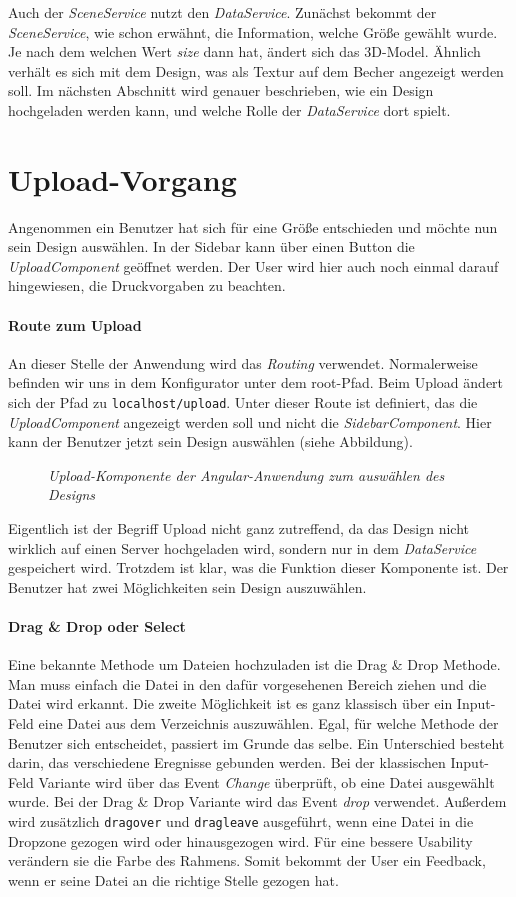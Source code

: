 Auch der \textit{SceneService} nutzt den \textit{DataService}. Zunächst bekommt der \textit{SceneService}, wie schon erwähnt, die Information, welche Größe gewählt wurde. Je nach dem welchen Wert \textit{size} dann hat, ändert sich das 3D-Model. Ähnlich verhält es sich mit dem Design, was als Textur auf dem Becher angezeigt werden soll. Im nächsten Abschnitt wird genauer beschrieben, wie ein Design hochgeladen werden kann, und welche Rolle der \textit{DataService} dort spielt.
%
\section{Upload-Vorgang}
\label{sec:umsetzung}
%
Angenommen ein Benutzer hat sich für eine Größe entschieden und möchte nun sein Design auswählen. In der Sidebar kann über einen Button die \textit{UploadComponent} geöffnet werden. Der User wird hier auch noch einmal darauf hingewiesen, die Druckvorgaben zu beachten.
\paragraph{Route zum Upload}
An dieser Stelle der Anwendung wird das \textit{Routing} verwendet. Normalerweise befinden wir uns in dem Konfigurator unter dem root-Pfad. Beim Upload ändert sich der Pfad zu \texttt{localhost/upload}. Unter dieser Route ist definiert, das die \textit{UploadComponent} angezeigt werden soll und nicht die \textit{SidebarComponent}. Hier kann der Benutzer jetzt sein Design auswählen (siehe Abbildung).
%
\begin{figure}[h]
	\centering
	{}
	\caption[UploadComponent des Konfigurators]{\textit{Upload-Komponente der Angular-Anwendung zum auswählen des Designs}}
	\label{fig:sidebar}
\end{figure}
%
Eigentlich ist der Begriff \glqq Upload \grqq nicht ganz zutreffend, da das Design nicht wirklich auf einen Server hochgeladen wird, sondern nur in dem \textit{DataService} gespeichert wird. Trotzdem ist klar, was die Funktion dieser Komponente ist. Der Benutzer hat zwei Möglichkeiten sein Design auszuwählen.
%
\paragraph{Drag \& Drop oder Select}
Eine bekannte Methode um Dateien hochzuladen ist die Drag \& Drop Methode. Man muss einfach die Datei in den dafür vorgesehenen Bereich ziehen und die Datei wird erkannt. Die zweite Möglichkeit ist es ganz klassisch über ein Input-Feld eine Datei aus dem Verzeichnis auszuwählen. Egal, für welche Methode der Benutzer sich entscheidet, passiert im Grunde das selbe. Ein Unterschied besteht darin, das verschiedene Eregnisse gebunden werden. Bei der klassischen Input-Feld Variante wird über das Event \textit{Change} überprüft, ob eine Datei ausgewählt wurde. Bei der Drag \& Drop Variante wird das Event \textit{drop} verwendet. Außerdem wird zusätzlich \texttt{dragover} und \texttt{dragleave} ausgeführt, wenn eine Datei in die Dropzone gezogen wird oder hinausgezogen wird. Für eine bessere Usability verändern sie die Farbe des Rahmens. Somit bekommt der User ein Feedback, wenn er seine Datei an die richtige Stelle gezogen hat.


